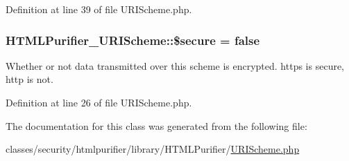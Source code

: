 Definition at line 39 of file U\+R\+I\+Scheme.\+php.

\hypertarget{classHTMLPurifier__URIScheme_a53fc8c93025cf82924f0c8f44d432e20}{
\subsubsection[{\$secure}]{\setlength{\rightskip}{0pt plus 5cm}H\+T\+M\+L\+Purifier\+\_\+\+U\+R\+I\+Scheme\+::\$secure = false}}\label{classHTMLPurifier__URIScheme_a53fc8c93025cf82924f0c8f44d432e20}
Whether or not data transmitted over this scheme is encrypted. https is secure, http is not. 

Definition at line 26 of file U\+R\+I\+Scheme.\+php.



The documentation for this class was generated from the following file\+:\begin{DoxyCompactItemize}
\item 
classes/security/htmlpurifier/library/\+H\+T\+M\+L\+Purifier/\hyperlink{URIScheme_8php}{U\+R\+I\+Scheme.\+php}\end{DoxyCompactItemize}
